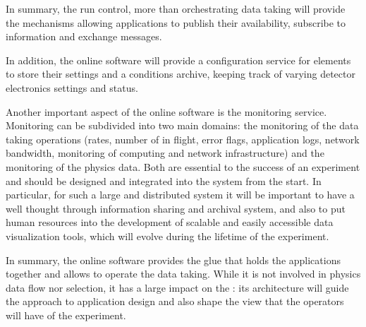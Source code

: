 In summary, the run control, more than orchestrating data taking will
provide the mechanisms allowing  applications to publish
their availability, subscribe to information and exchange messages. 

In addition, the online software will provide a configuration service
for  elements to store their settings and a conditions
archive, keeping track of varying detector electronics settings and
status.

Another important aspect of the online software is the monitoring
service.
Monitoring can be subdivided into two main domains: the monitoring of
the data taking operations (rates, number of 
in flight, error flags, application logs, network bandwidth, monitoring
of computing and network infrastructure) and the monitoring of the
physics data.
Both are essential to the success of an experiment and should be
designed and integrated into the  system from the start.
In particular, for such a large and distributed system it will be
important to have a well thought through information sharing and
archival system, and also to put human resources into the development
of scalable and easily accessible data visualization tools, which will
evolve during the lifetime of the experiment.

In summary, the online software provides the glue that holds the
 applications together and allows to operate the data
taking.
While it is not involved in physics data flow nor selection, it has a
large impact on the : its architecture will guide the
approach to  application design and also shape the view
that the operators will have of the experiment.

